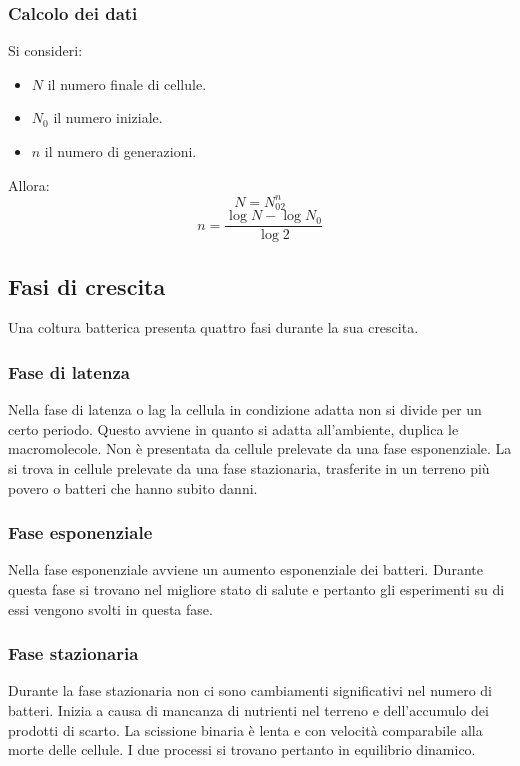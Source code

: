 		\subsubsection{Calcolo dei dati}
		Si consideri:
		\begin{multicols}{3}
			\begin{itemize}
				\item $N$ il numero finale di cellule.
				\item $N_0$ il numero iniziale.
				\item $n$ il numero di generazioni.
			\end{itemize}
		\end{multicols}
		Allora:
		\[N=N_02^n\]
		\[n=\dfrac{\log N - \log N_0}{\log 2}\]
	
	\subsection{Fasi di crescita}
	Una coltura batterica presenta quattro fasi durante la sua crescita.

		\subsubsection{Fase di latenza}
		Nella fase di latenza o lag la cellula in condizione adatta non si divide per un certo periodo.
		Questo avviene in quanto si adatta all'ambiente, duplica le macromolecole.
		Non \`e presentata da cellule prelevate da una fase esponenziale.
		La si trova in cellule prelevate da una fase stazionaria, trasferite in un terreno pi\`u povero o batteri che hanno subito danni.

		\subsubsection{Fase esponenziale}
		Nella fase esponenziale avviene un aumento esponenziale dei batteri.
		Durante questa fase si trovano nel migliore stato di salute e pertanto gli esperimenti su di essi vengono svolti in questa fase.

		\subsubsection{Fase stazionaria}
		Durante la fase stazionaria non ci sono cambiamenti significativi nel numero di batteri.
		Inizia a causa di mancanza di nutrienti nel terreno e dell'accumulo dei prodotti di scarto.
		La scissione binaria \`e lenta e con velocit\`a comparabile alla morte delle cellule.
		I due processi si trovano pertanto in equilibrio dinamico.

